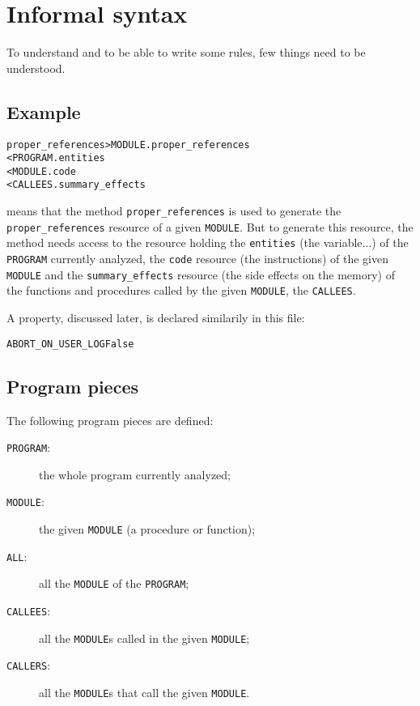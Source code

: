 \documentclass[a4paper]{report}
\begin{document}
\section{Informal syntax}
\label{sec:informal-syntax}

To understand and to be able to write some rules, few things need to be
understood.

\subsection{Example}
\label{sec:example}

\begin{alltt}
proper_references       > MODULE.proper_references
        < PROGRAM.entities
        < MODULE.code
        < CALLEES.summary_effects
\end{alltt}
means that the method \verb|proper_references| is used to generate the
\verb|proper_references| resource of a given \texttt{MODULE}. But to
generate this resource, the method needs access to the resource holding
the \texttt{entities} (the variable...) of the \texttt{PROGRAM} currently
analyzed, the \texttt{code} resource (the instructions) of the given
\texttt{MODULE} and the \verb/summary_effects/ resource (the side effects
on the memory) of the functions and procedures called by the given
\texttt{MODULE}, the \texttt{CALLEES}.

A property, discussed later, is declared similarily in this file:
\begin{alltt}
ABORT_ON_USER_LOG False
\end{alltt}

\subsection{Program pieces}
\label{sec:program-pieces}


The following program pieces are defined:
\begin{description}
\item[\texttt{PROGRAM}:] the whole program currently analyzed;
\item[\texttt{MODULE}:] the given \texttt{MODULE} (a procedure or
  function);
\item[\texttt{ALL}:] all the \texttt{MODULE} of the \texttt{PROGRAM};
\item[\texttt{CALLEES}:] all the \texttt{MODULE}s called in the given
  \texttt{MODULE};
\item[\texttt{CALLERS}:] all the \texttt{MODULE}s that call the given
  \texttt{MODULE}.
\end{description}
\end{document}
